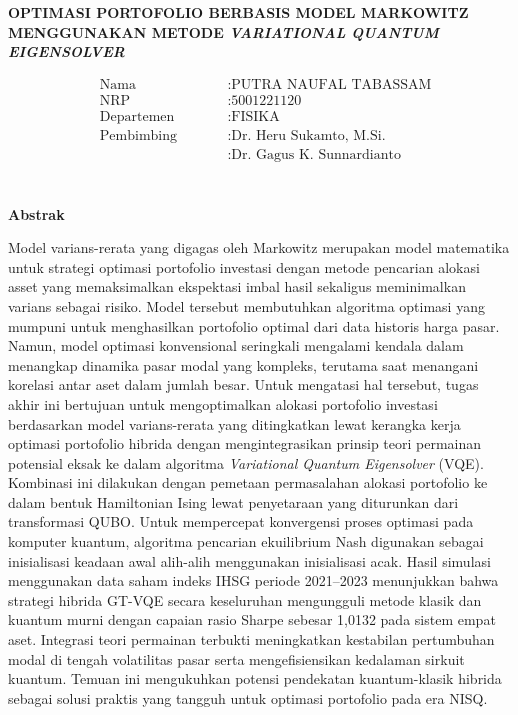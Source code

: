 \begin{center}
	\large{\textbf{OPTIMASI PORTOFOLIO BERBASIS MODEL MARKOWITZ MENGGUNAKAN METODE \textit{VARIATIONAL QUANTUM EIGENSOLVER}}}
\end{center}
\begin{minipage}{5cm}
\begin{align*}
&\text{Nama} \qquad &&: \text{PUTRA NAUFAL TABASSAM} \\
&\text{NRP} \qquad &&: \text{5001221120} \\
&\text{Departemen} \qquad &&: \text{FISIKA} \\
&\text{Pembimbing} \qquad &&: \text{Dr. Heru Sukamto, M.Si.} \\
& \qquad &&: \text{Dr. Gagus K. Sunnardianto} \\
\end{align*}
\end{minipage} \\
\textbf{Abstrak} 
\par Model varians-rerata yang digagas oleh Markowitz merupakan model matematika untuk strategi optimasi portofolio investasi dengan metode pencarian alokasi asset yang memaksimalkan ekspektasi imbal hasil sekaligus meminimalkan varians sebagai risiko. Model tersebut membutuhkan algoritma optimasi yang mumpuni untuk menghasilkan portofolio optimal dari data historis harga pasar. Namun, model optimasi konvensional seringkali mengalami kendala dalam menangkap dinamika pasar modal yang kompleks, terutama saat menangani korelasi antar aset dalam jumlah besar. Untuk mengatasi hal tersebut, tugas akhir ini bertujuan untuk mengoptimalkan alokasi portofolio investasi berdasarkan model varians-rerata yang ditingkatkan lewat kerangka kerja optimasi portofolio hibrida dengan mengintegrasikan prinsip teori permainan potensial eksak ke dalam algoritma \textit{Variational Quantum Eigensolver} (VQE). Kombinasi ini dilakukan dengan pemetaan permasalahan alokasi portofolio ke dalam bentuk Hamiltonian Ising lewat penyetaraan yang diturunkan dari transformasi QUBO. Untuk mempercepat konvergensi proses optimasi pada komputer kuantum, algoritma pencarian ekuilibrium Nash digunakan sebagai inisialisasi keadaan awal alih-alih menggunakan inisialisasi acak. Hasil simulasi menggunakan data saham indeks IHSG periode 2021--2023 menunjukkan bahwa strategi hibrida GT-VQE secara keseluruhan mengungguli metode klasik dan kuantum murni dengan capaian rasio Sharpe sebesar 1,0132 pada sistem empat aset. Integrasi teori permainan terbukti meningkatkan kestabilan pertumbuhan modal di tengah volatilitas pasar serta mengefisiensikan kedalaman sirkuit kuantum. Temuan ini mengukuhkan potensi pendekatan kuantum-klasik hibrida sebagai solusi praktis yang tangguh untuk optimasi portofolio pada era NISQ.

